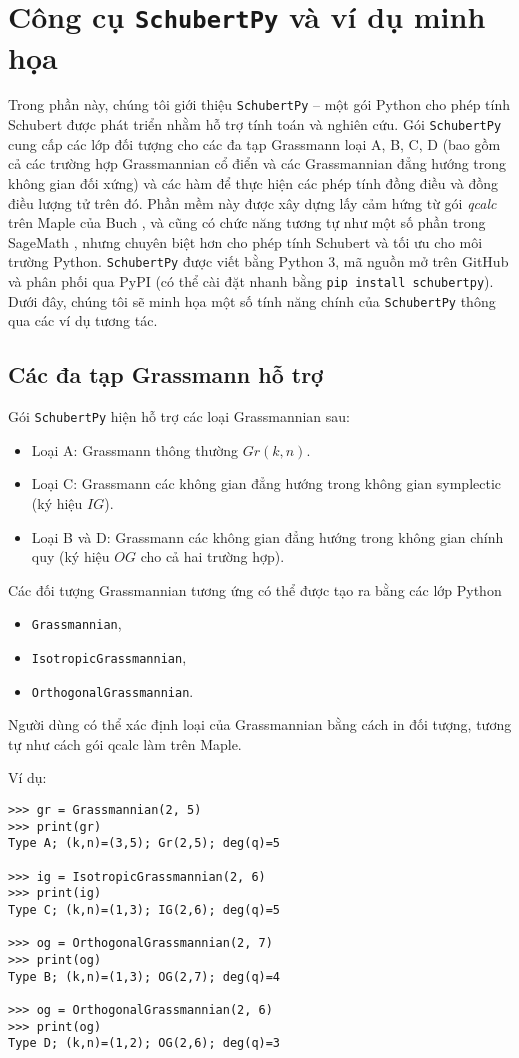 \section{Công cụ \texttt{SchubertPy} và ví dụ minh họa}
Trong phần này, chúng tôi giới thiệu \texttt{SchubertPy} – một gói Python cho phép tính Schubert được phát triển nhằm hỗ trợ tính toán và nghiên cứu. Gói \texttt{SchubertPy} cung cấp các lớp đối tượng cho các đa tạp Grassmann loại A, B, C, D (bao gồm cả các trường hợp Grassmannian cổ điển và các Grassmannian đẳng hướng trong không gian đối xứng) và các hàm để thực hiện các phép tính đồng điều và đồng điều lượng tử trên đó. Phần mềm này được xây dựng lấy cảm hứng từ gói \textit{qcalc} trên Maple của Buch \cite{buch2008qcalc}, và cũng có chức năng tương tự như một số phần trong SageMath \cite{SageMath2024}, nhưng chuyên biệt hơn cho phép tính Schubert và tối ưu cho môi trường Python. \texttt{SchubertPy} được viết bằng Python 3, mã nguồn mở trên GitHub và phân phối qua PyPI (có thể cài đặt nhanh bằng \texttt{pip install schubertpy}). Dưới đây, chúng tôi sẽ minh họa một số tính năng chính của \texttt{SchubertPy} thông qua các ví dụ tương tác.

\subsection{Các đa tạp Grassmann hỗ trợ}
Gói \texttt{SchubertPy} hiện hỗ trợ các loại Grassmannian sau:
\begin{itemize}
    \item Loại A: Grassmann thông thường $Gr(k,n)$.
    \item Loại C: Grassmann các không gian đẳng hướng trong không gian symplectic (ký hiệu $IG$).
    \item Loại B và D: Grassmann các không gian đẳng hướng trong không gian chính quy (ký hiệu $OG$ cho cả hai trường hợp).
\end{itemize}
Các đối tượng Grassmannian tương ứng có thể được tạo ra bằng các lớp Python 
\begin{itemize}
    \item \texttt{Grassmannian},
    \item \texttt{IsotropicGrassmannian},
    \item \texttt{OrthogonalGrassmannian}.
\end{itemize}
Người dùng có thể xác định loại của Grassmannian bằng cách in đối tượng, tương tự như cách gói qcalc làm trên Maple. 

Ví dụ:
\small
\begin{verbatim}
>>> gr = Grassmannian(2, 5)
>>> print(gr)
Type A; (k,n)=(3,5); Gr(2,5); deg(q)=5

>>> ig = IsotropicGrassmannian(2, 6)
>>> print(ig)
Type C; (k,n)=(1,3); IG(2,6); deg(q)=5

>>> og = OrthogonalGrassmannian(2, 7)
>>> print(og)
Type B; (k,n)=(1,3); OG(2,7); deg(q)=4

>>> og = OrthogonalGrassmannian(2, 6)
>>> print(og)
Type D; (k,n)=(1,2); OG(2,6); deg(q)=3
\end{verbatim}
\normalsize

